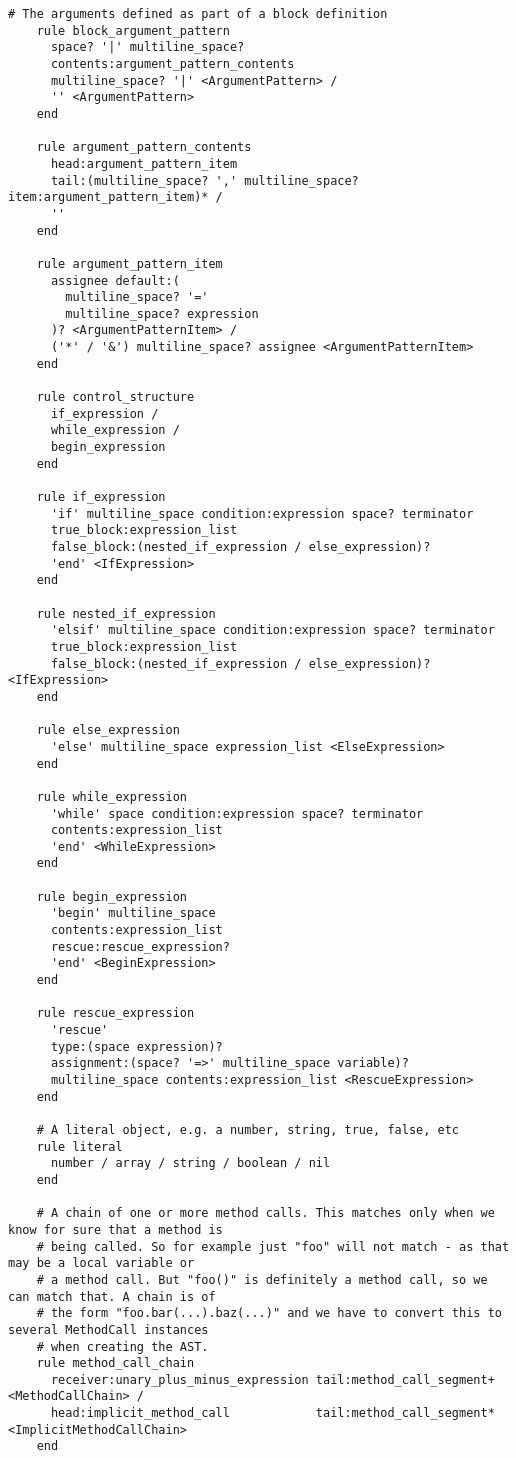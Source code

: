 \begin{lstlisting}[title={\small\Helvetica parser/language.treetop},language=treetop]
    # The arguments defined as part of a block definition
    rule block_argument_pattern
      space? '|' multiline_space?
      contents:argument_pattern_contents
      multiline_space? '|' <ArgumentPattern> /
      '' <ArgumentPattern>
    end
    
    rule argument_pattern_contents
      head:argument_pattern_item
      tail:(multiline_space? ',' multiline_space? item:argument_pattern_item)* /
      ''
    end
    
    rule argument_pattern_item
      assignee default:(
        multiline_space? '='
        multiline_space? expression
      )? <ArgumentPatternItem> /
      ('*' / '&') multiline_space? assignee <ArgumentPatternItem>
    end
    
    rule control_structure
      if_expression /
      while_expression /
      begin_expression
    end
    
    rule if_expression
      'if' multiline_space condition:expression space? terminator
      true_block:expression_list
      false_block:(nested_if_expression / else_expression)?
      'end' <IfExpression>
    end
    
    rule nested_if_expression
      'elsif' multiline_space condition:expression space? terminator
      true_block:expression_list
      false_block:(nested_if_expression / else_expression)? <IfExpression>
    end
    
    rule else_expression
      'else' multiline_space expression_list <ElseExpression>
    end
    
    rule while_expression
      'while' space condition:expression space? terminator
      contents:expression_list
      'end' <WhileExpression>
    end
    
    rule begin_expression
      'begin' multiline_space
      contents:expression_list
      rescue:rescue_expression?
      'end' <BeginExpression>
    end
    
    rule rescue_expression
      'rescue'
      type:(space expression)?
      assignment:(space? '=>' multiline_space variable)?
      multiline_space contents:expression_list <RescueExpression>
    end
    
    # A literal object, e.g. a number, string, true, false, etc
    rule literal
      number / array / string / boolean / nil
    end
    
    # A chain of one or more method calls. This matches only when we know for sure that a method is
    # being called. So for example just "foo" will not match - as that may be a local variable or
    # a method call. But "foo()" is definitely a method call, so we can match that. A chain is of 
    # the form "foo.bar(...).baz(...)" and we have to convert this to several MethodCall instances
    # when creating the AST.
    rule method_call_chain
      receiver:unary_plus_minus_expression tail:method_call_segment+ <MethodCallChain> /
      head:implicit_method_call            tail:method_call_segment* <ImplicitMethodCallChain>
    end
    

\end{lstlisting}
